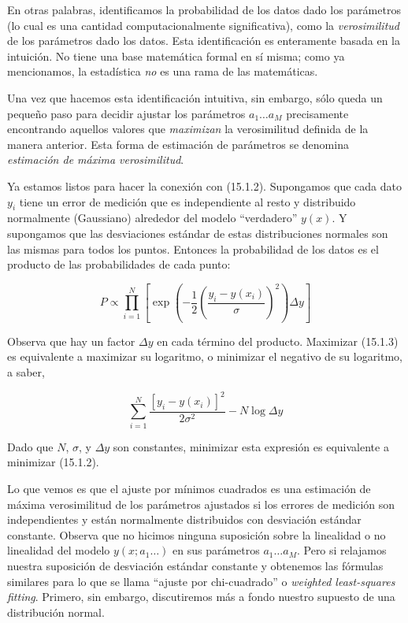 \documentclass[10pt,a4paper]{book}
\begin{document}
En otras palabras, identificamos la probabilidad de los datos dado los parámetros (lo cual es una cantidad computacionalmente significativa), como la \textit{verosimilitud} de los parámetros dado los datos. Esta identificación es enteramente basada en la intuición. No tiene una base matemática formal en sí misma; como ya mencionamos, la estadística \textit{no} es una rama de las matemáticas.

Una vez que hacemos esta identificación intuitiva, sin embargo, sólo queda un pequeño paso para decidir ajustar los parámetros $a_1 \ldots a_M$ precisamente encontrando aquellos valores que \textit{maximizan} la verosimilitud definida de la manera anterior. Esta forma de estimación de parámetros se denomina \textit{estimación de máxima verosimilitud}.

Ya estamos listos para hacer la conexión con (15.1.2). Supongamos que cada dato $y_i$ tiene un error de medición que es independiente al resto y distribuido normalmente (Gaussiano) alrededor del modelo ``verdadero'' $y(x)$. Y supongamos que las desviaciones estándar de estas distribuciones normales son las mismas para todos los puntos. Entonces la probabilidad de los datos es el producto de las probabilidades de cada punto:

\begin{equation}
P \propto \prod_{i=1}^{N} \left[ \exp\left( -\frac{1}{2} \left( \frac{y_i - y(x_i)}{\sigma} \right)^2 \right) \Delta y \right]
\end{equation}

Observa que hay un factor $\Delta y$ en cada término del producto. Maximizar (15.1.3) es equivalente a maximizar su logaritmo, o minimizar el negativo de su logaritmo, a saber,

\begin{equation}
\sum_{i=1}^{N} \frac{[y_i - y(x_i)]^2}{2\sigma^2} - N \log \Delta y
\end{equation}

Dado que $N$, $\sigma$, y $\Delta y$ son constantes, minimizar esta expresión es equivalente a minimizar (15.1.2).

Lo que vemos es que el ajuste por mínimos cuadrados es una estimación de máxima verosimilitud de los parámetros ajustados si los errores de medición son independientes y están normalmente distribuidos con desviación estándar constante. Observa que no hicimos ninguna suposición sobre la linealidad o no linealidad del modelo $y(x; a_1 \ldots)$ en sus parámetros $a_1 \ldots a_M$. Pero si relajamos nuestra suposición de desviación estándar constante y obtenemos las fórmulas similares para lo que se llama ``ajuste por chi-cuadrado'' o \textit{weighted least-squares fitting}. Primero, sin embargo, discutiremos más a fondo nuestro supuesto de una distribución normal.
\end{document}

